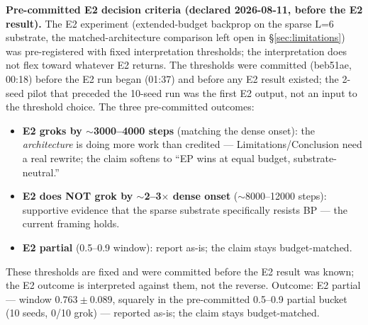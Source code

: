 \documentclass[11pt]{article}
\begin{document}
\textbf{Pre-committed E2 decision criteria (declared 2026-08-11, before the E2 result).} The E2 experiment (extended-budget backprop on the sparse L=6 substrate, the matched-architecture comparison left open in \S\ref{sec:limitations}) was pre-registered with fixed interpretation thresholds; the interpretation does not flex toward whatever E2 returns. The thresholds were committed (beb51ae, 00:18) before the E2 run began (01:37) and before any E2 result existed; the 2-seed pilot that preceded the 10-seed run was the first E2 output, not an input to the threshold choice. The three pre-committed outcomes:
\begin{itemize}
\item \textbf{E2 groks by $\sim$3000--4000 steps} (matching the dense onset): the \emph{architecture} is doing more work than credited --- Limitations/Conclusion need a real rewrite; the claim softens to ``EP wins at equal budget, substrate-neutral.''
\item \textbf{E2 does NOT grok by $\sim$2--3$\times$ dense onset} ($\sim$8000--12000 steps): supportive evidence that the sparse substrate specifically resists BP --- the current framing holds.
\item \textbf{E2 partial} (0.5--0.9 window): report as-is; the claim stays budget-matched.
\end{itemize}
These thresholds are fixed and were committed before the E2 result was known; the E2 outcome is interpreted against them, not the reverse. Outcome: E2 partial --- window $0.763 \pm 0.089$, squarely in the pre-committed 0.5--0.9 partial bucket (10 seeds, 0/10 grok) --- reported as-is; the claim stays budget-matched.
\end{document}
